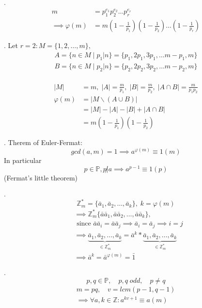 \Theorem.
\begin{align*}
  m &= p_1^{e_1} p_2^{e_2} \ldots p_r^{e_r} \\
  \implies \varphi(m) &= m \left( 1-\frac{1}{p_1} \right) \left( 1-\frac{1}{p_2} \right) \ldots \left( 1-\frac{1}{p_r} \right)
\end{align*}

\Proof.
Let $r=2: M = \{1,2, \ldots, m\},$ 
\begin{align*}
  A = \{ n \in M \mid p_1|n\} = \{p_1, 2p_1, 3p_1, \ldots m-p_1, m\} \\
  B = \{ n \in M \mid p_2|n\} = \{p_2, 2p_2, 3p_2, \ldots m-p_2, m\} \\
\end{align*}

\begin{align*}
  |M| &= m, \; |A| = \frac{m}{p_1}, \; |B| = \frac{m}{p_2}, \;
    |A \cap B| = \frac{m}{p_1p_2}\\
  \varphi(m) 
    &= | M \backslash(A\cup B) | \\
    &= |M| - |A| - |B| + | A \cap B|\\
    &= m \left(1- \frac{1}{p_1} \right) \left(1- \frac{1}{p_2} \right)
\end{align*}

\Theorem.
Therem of Euler-Fermat:
\[
  gcd(a,m) = 1 \implies a ^{\varphi(m)} \equiv 1 (m)
\]
In particular 
\[
  p \in \mathbb{P}, p \not| a \implies a^{p-1} \equiv 1 (p)
\]
(Fermat's little theorem)

\Proof.
\[
  \mathbb{Z}_m^{*} = \{\bar{a}_1, \bar{a}_2, \ldots, \bar{a}_k \}, \;k = \varphi(m)
\]
\begin{align*}
  &\implies \mathbb{Z}_m^{*} \{\bar{a}\bar{a}_1, \bar{a}\bar{a}_2, \ldots, \bar{a}\bar{a}_k \}, \\
  &\text{ since } \bar{a}\bar{a}_i = \bar{a}\bar{a}_j
    \implies \bar{a}_i = \bar{a}_j \implies i = j \\
  &\implies \underbrace{\bar{a}_1, \bar{a}_2, \ldots, \bar{a}_k}_
        {\in \mathbb{Z}_m^{*}}
      = \bar{a}^k * \underbrace{\bar{a}_1, \bar{a}_2, \ldots, \bar{a}_k}_
        {\in \mathbb{Z}_m^{*}} \\
  &\implies \bar{a}^k = \bar{a}^{\varphi(m)} = \bar{1} 
\end{align*}

\Theorem.
\[
  p, q \in \mathbb{P}, \quad p,q\; odd, \quad p \neq q
\]
\begin{align*}
  m = pq, \quad v = lcm(p-1, q-1) \\
  \implies \forall a,k \in \mathbb{Z}: a^{kv + 1} \equiv a(m)
\end{align*}

